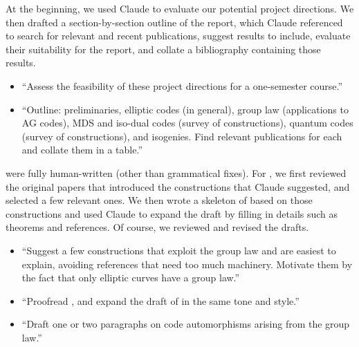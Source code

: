 \documentclass[twocolumn, 11pt]{scrartcl}
\begin{document}
\printbibliography

\vfill\pagebreak
{}

At the beginning, we used Claude to evaluate our potential project directions. We then drafted a section-by-section outline of the report, which Claude referenced to search for relevant and recent publications, suggest results to include, evaluate their suitability for the report, and collate a bibliography containing those results.
\begin{itemize}
    \item ``Assess the feasibility of these project directions for a one-semester course.''
    \item ``Outline: preliminaries, elliptic codes (in general), group law (applications to AG codes), MDS and iso-dual codes (survey of constructions), quantum codes (survey of constructions), and isogenies. Find relevant publications for each and collate them in a table.''
\end{itemize}

 were fully human-written (other than grammatical fixes). For , we first reviewed the original papers that introduced the constructions that Claude suggested, and selected a few relevant ones. We then wrote a skeleton of  based on those constructions and used Claude to expand the draft by filling in details such as theorems and references. Of course, we reviewed and revised the drafts.
\begin{itemize}
    \item ``Suggest a few constructions that exploit the group law and are easiest to explain, avoiding references that need too much machinery. Motivate them by the fact that only elliptic curves have a group law.''
    \item ``Proofread , and expand the draft of  in the same tone and style.''
    \item ``Draft one or two paragraphs on code automorphisms arising from the group law.''
\end{itemize}
\end{document}
